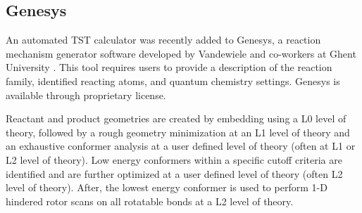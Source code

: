\documentclass[preprint, 11pt]{elsarticle} %
\begin{document}

\subsection{Genesys}

An automated TST calculator was recently added to Genesys, a reaction mechanism generator software developed by Vandewiele and co-workers at Ghent University \cite{VANDEVIJVER:2018, vandewiele:2012}. 
This tool requires users to provide a description of the reaction family, identified reacting atoms, and quantum chemistry settings.
Genesys is available through proprietary license.

Reactant and product geometries are created by embedding using a L0 level of theory, followed by a rough geometry minimization at an L1 level of theory and an exhaustive conformer analysis at a user defined level of theory (often at L1 or L2 level of theory).
Low energy conformers within a specific cutoff criteria are identified and are further optimized at a user defined level of theory (often L2 level of theory).
After, the lowest energy conformer is used to perform 1-D hindered rotor scans on all rotatable bonds at a L2 level of theory.
\end{document}
